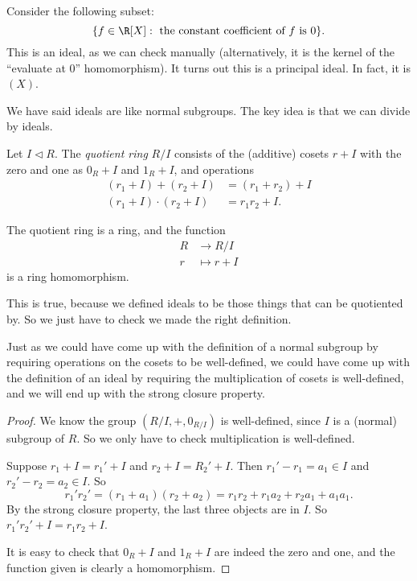 \documentclass[a4paper]{article}
\begin{document}
\begin{eg}
  Consider the following subset:
  \[
    \{f \in \R[X]: \text{ the constant coefficient of }f \text{ is }0\}.
  \]
  This is an ideal, as we can check manually (alternatively, it is the kernel of the ``evaluate at $0$'' homomorphism). It turns out this is a principal ideal. In fact, it is $(X)$.
\end{eg}

We have said ideals are like normal subgroups. The key idea is that we can divide by ideals.

\begin{defi}
  Let $I \lhd R$. The \emph{quotient ring} $R/I$ consists of the (additive) cosets $r + I$ with the zero and one as $0_R + I$ and $1_R + I$, and operations
  \begin{align*}
    (r_1 + I) + (r_2 + I) &= (r_1 + r_2) + I\\
    (r_1 + I) \cdot (r_2 + I) &= r_1r_2 + I.
  \end{align*}
\end{defi}

\begin{prop}
  The quotient ring is a ring, and the function
  \begin{align*}
    R &\to R/I\\
    r &\mapsto r + I
  \end{align*}
  is a ring homomorphism.
\end{prop}
This is true, because we defined ideals to be those things that can be quotiented by. So we just have to check we made the right definition.

Just as we could have come up with the definition of a normal subgroup by requiring operations on the cosets to be well-defined, we could have come up with the definition of an ideal by requiring the multiplication of cosets is well-defined, and we will end up with the strong closure property.

\begin{proof}
  We know the group $(R/I, +, 0_{R/I})$ is well-defined, since $I$ is a (normal) subgroup of $R$. So we only have to check multiplication is well-defined.

  Suppose $r_1 + I = r_1' + I$ and $r_2 + I = R_2' + I$. Then $r_1' - r_1 = a_1 \in I$ and $r_2' - r_2 = a_2 \in I$. So
  \[
    r_1' r_2' = (r_1 + a_1) (r_2 + a_2) = r_1 r_2 + r_1a_2 + r_2a_1 + a_1a_1.
  \]
  By the strong closure property, the last three objects are in $I$. So $r_1' r_2' + I = r_1r_2 + I$.

  It is easy to check that $0_R + I$ and $1_R + I$ are indeed the zero and one, and the function given is clearly a homomorphism.
\end{proof}
\end{document}
